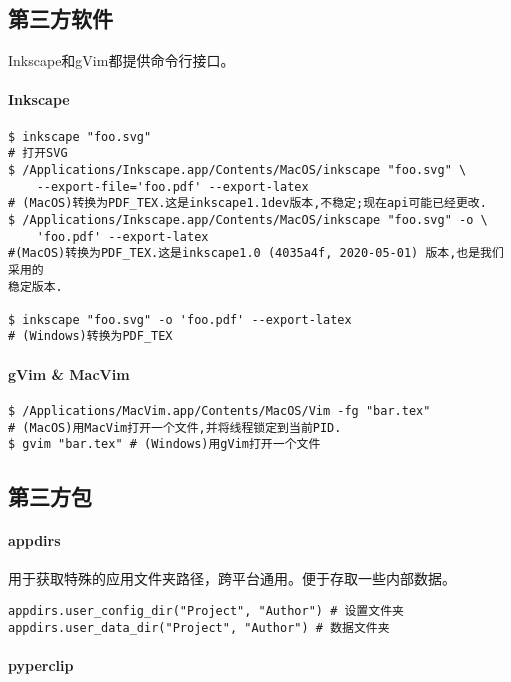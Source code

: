 \documentclass[AutoFakeBold,letterpaper,12pt,hidelinks]{article}
\begin{document}
\subsection{第三方软件}%

Inkscape和gVim都提供命令行接口。

\paragraph{Inkscape}

\begin{verbatim}
$ inkscape "foo.svg" 
# 打开SVG
$ /Applications/Inkscape.app/Contents/MacOS/inkscape "foo.svg" \
	--export-file='foo.pdf' --export-latex 
# (MacOS)转换为PDF_TEX.这是inkscape1.1dev版本,不稳定;现在api可能已经更改.
$ /Applications/Inkscape.app/Contents/MacOS/inkscape "foo.svg" -o \
	'foo.pdf' --export-latex
#(MacOS)转换为PDF_TEX.这是inkscape1.0 (4035a4f, 2020-05-01) 版本,也是我们采用的
稳定版本.

$ inkscape "foo.svg" -o 'foo.pdf' --export-latex 
# (Windows)转换为PDF_TEX
\end{verbatim}

\paragraph{gVim \& MacVim}

\begin{verbatim}
$ /Applications/MacVim.app/Contents/MacOS/Vim -fg "bar.tex" 
# (MacOS)用MacVim打开一个文件,并将线程锁定到当前PID.
$ gvim "bar.tex" # (Windows)用gVim打开一个文件
\end{verbatim}

\subsection{第三方包}
\paragraph{appdirs}

用于获取特殊的应用文件夹路径，跨平台通用。便于存取一些内部数据。

\begin{verbatim}
appdirs.user_config_dir("Project", "Author") # 设置文件夹
appdirs.user_data_dir("Project", "Author") # 数据文件夹
\end{verbatim}

\paragraph{pyperclip}
\end{document}
